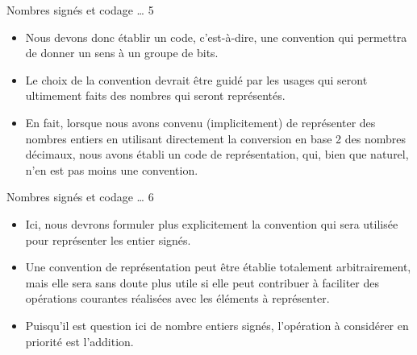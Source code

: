 \documentclass[presentation]{beamer}
\begin{document}
\begin{frame}[label={sec:org83fa764}]{Nombres signés et codage \ldots{} 5}
\begin{itemize}
\item Nous devons donc établir un \alert{code}, c'est-à-dire, une \alert{convention} qui permettra de donner un sens à un groupe de bits.

\item Le choix de la convention devrait être guidé par les usages qui seront ultimement faits des nombres qui seront représentés.

\item En fait, lorsque nous avons convenu (implicitement) de représenter des nombres entiers en utilisant directement la conversion en base 2 des nombres décimaux, nous avons établi un code de représentation, qui, bien que naturel, n'en est pas moins une convention.
\end{itemize}
\end{frame}

\begin{frame}[label={sec:orgc1131e3}]{Nombres signés et codage \ldots{} 6}
\begin{itemize}
\item Ici, nous devrons formuler plus explicitement la convention qui sera utilisée pour représenter les entier signés.

\item Une convention de représentation peut être établie totalement arbitrairement, mais elle sera sans doute plus utile si elle peut contribuer à faciliter des opérations courantes réalisées avec les éléments à représenter.

\item Puisqu'il est question ici de nombre entiers signés, l'opération à considérer en priorité est l'addition.
\end{itemize}
\end{frame}
\end{document}
